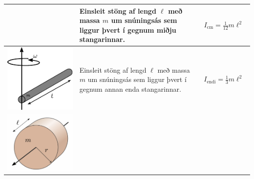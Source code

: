 \ifdefined \wholebook \else\documentclass[oneside]{book}\usepackage{EdlBook}\graphicspath{{figures/}}
\begin{document}
\begin{table}[h!]
\begin{tabular}{ | c | m{5cm} | m{5cm} | }
\begin{minipage}{.3\textwidth}
      \vspace{0.3cm}
    \end{minipage}
    &
      Einsleit stöng af lengd $\ell$ með massa $m$ um snúningsás sem liggur þvert í gegnum miðju stangarinnar.
    & 
      \begin{align*}
          I_{\text{cm}} = \frac{1}{12}m\ell^2
      \end{align*}
    \\ \hline
            \begin{minipage}{.27\textwidth}
        \vspace{0.3cm}
    \centering
      \includegraphics[width=0.75\linewidth]{momentsOfInertia/Moment_of_inertia_rod_end.pdf}
      \vspace{0.3cm}
    \end{minipage}
    &
      Einsleit stöng af lengd $\ell$ með massa $m$ um snúningsás sem liggur þvert í gegnum annan enda stangarinnar.
    & 
      \begin{align*}
          I_{\text{endi}} = \frac{1}{3}m\ell^2
      \end{align*}
    \\ \hline
                        \begin{minipage}{.3\textwidth}
        \vspace{0.3cm}
    \centering
      \includegraphics[width=0.75\linewidth]{momentsOfInertia/gsivaln.pdf}

\end{minipage}
\end{tabular}
\end{table}
\end{document}

